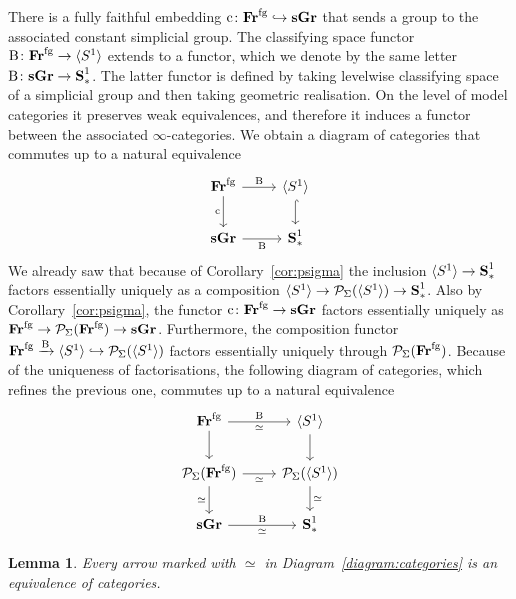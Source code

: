 \documentclass[psamsfonts]{amsart}
\theoremstyle{plain}
\newtheorem{lem}[thm]{Lemma}
\theoremstyle{definition}
\theoremstyle{remark}
\newcommand{\catname}[1]{{\normalfont\textbf{#1}}}
\newcommand{\circles}{\langle S^1 \rangle}
\newcommand{\spaces}{\catname{S}_*}
\newcommand{\connected}{\spaces^{1}}
\newcommand{\fr}{\allfr^{\mathrm{fg}}}
\newcommand{\allfr}{\catname{Fr}}
\newcommand{\presh}{\mathcal{P}}
\newcommand{\sgr}{\catname{sGr}}
\newcommand{\classifying}{\operatorname{B}}
\newcommand{\const}{\mathrm{c}}
\begin{document}
There is a fully faithful embedding $\const\colon \fr\hookrightarrow \sgr$ that sends a group to the associated constant simplicial group. The classifying space functor $\classifying \colon \fr \to \circles$ extends to a functor, which we denote by the same letter $\classifying \colon \sgr \to \connected$. The latter functor is defined by taking levelwise classifying space of a simplicial group and then taking geometric realisation. On the level of model categories it preserves weak equivalences, and therefore it induces a functor between the associated $\infty$-categories. We obtain a diagram of categories that commutes up to a natural equivalence
\[\begin{tikzcd}
	\fr & \circles \\
	\sgr & \connected
	\arrow["\classifying", from=1-1, to=1-2]
	\arrow["\const"', from=1-1, to=2-1]
	\arrow[hook, from=1-2, to=2-2]
	\arrow["\classifying"', from=2-1, to=2-2]
\end{tikzcd}\]
We already saw that because of Corollary~\ref{cor:psigma} the inclusion $\circles\to \connected$ factors essentially uniquely as a composition $\circles \to \presh_{\Sigma}(\circles) \to \connected$. Also by Corollary~\ref{cor:psigma}, the functor $\const\colon \fr\to \sgr$ factors essentially uniquely as $\fr\to \presh_{\Sigma}(\fr) \to \sgr$. Furthermore, the composition functor $\fr \xrightarrow{\classifying} \circles \hookrightarrow \presh_{\Sigma}(\circles)$ factors essentially uniquely through $\presh_{\Sigma}(\fr)$. Because of the uniqueness of factorisations, the following diagram of categories, which refines the previous one, commutes up to a natural equivalence
\begin{equation}\label{diagram:categories}
\begin{tikzcd}
	\fr & \circles \\
	{\presh_{\Sigma}(\fr)} & {\presh_{\Sigma}(\circles)} \\
	\sgr & \connected
	\arrow["\simeq"', "\classifying", from=1-1, to=1-2]
	\arrow[from=1-1, to=2-1]
	\arrow[from=1-2, to=2-2]
	\arrow["\simeq"', from=2-1, to=2-2]
	\arrow["\simeq"', from=2-1, to=3-1]
	\arrow["\simeq", from=2-2, to=3-2]
	\arrow["\simeq"', "\classifying", from=3-1, to=3-2]
\end{tikzcd}
\end{equation}
\begin{lem}\label{lemma:equivalences}
Every arrow marked with $\simeq$ in Diagram~\eqref{diagram:categories} is an equivalence of categories. 
\end{lem}
\end{document}
